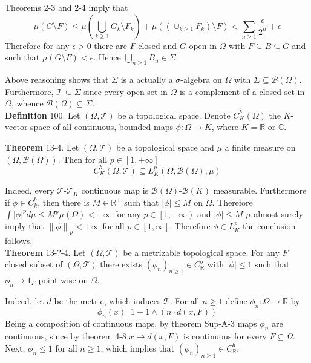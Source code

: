 \documentclass[a4paper]{article}
\newcommand{\clo}[1]{\left [ #1 \right ]}
\newcommand{\clop}[1]{\left [ #1 \right )}
\newcommand{\brac}[1]{\left ( #1 \right )}
\newcommand{\abs}[1]{\left | #1 \right |}
\newcommand{\nrm}[1]{\left\| #1 \right \|}
\newcommand{\Real}{\mathbb{R}}
\newcommand{\Cplx}{\mathbb{C}}
\newcommand{\Tcal}{\mathcal{T}}
\newcommand{\borel}[1]{\mathcal{B}\brac{#1}}
\newcommand{\defn}{\mathop{\overset{\Delta}{=}}\nolimits}
\begin{document}
Theorems 2-3 and 2-4 imply that \[\mu\brac{G\setminus F}\leq \mu\brac{\bigcup_{k\geq1} G_k\setminus F_k}+\mu\brac{\brac{\cup_{k\geq1} F_k}\setminus F}< \sum_{n\geq1} \frac{\epsilon}{2^n} + \epsilon\] Therefore for any $\epsilon>0$ there are $F$ closed and $G$ open in $\Omega$ with $F\subseteq B\subseteq G$ and such that $\mu\brac{G\setminus F}<\epsilon$. Hence $\bigcup_{n\geq1} B_n\in \Sigma$.

Above reasoning shows that $\Sigma$ is a actually a $\sigma$-algebra on $\Omega$ with $\Sigma\subseteq \borel{\Omega}$. Furthermore, $\Tcal\subseteq \Sigma$ since every open set in $\Omega$ is a complement of a closed set in $\Omega$, whence $\borel{\Omega}\subseteq \Sigma$.\\

\noindent \textbf{Definition} 100.
Let $\brac{\Omega, \Tcal}$ be a topological space. Denote $C^b_K\brac{\Omega}$ the $K$-vector space of all continuous, bounded maps $\phi:\Omega\to K$, where $K=\Real$ or $\Cplx$.

\label{thm:bound_cont_sub_lp} \noindent \textbf{Theorem} 13-4.
Let $\brac{\Omega, \Tcal}$ be a topological space and $\mu$ a finite measure on $\brac{\Omega, \borel{\Omega}}$. Then for all $p\in \clo{1,+\infty}$ \[C^b_K\brac{\Omega,\Tcal}\subseteq L^p_K\brac{\Omega,\borel{\Omega},\mu}\]

Indeed, every $\Tcal$-$\Tcal_K$ continuous map is $\borel{\Omega}$-$\borel{K}$ measurable. Furthermore if $\phi\in C^b_k$, then there is $M\in \Real^+$ such that $\abs{\phi}\leq M$ on $\Omega$. Therefore $\int \abs{\phi}^p d\mu\leq M^p \mu\brac{\Omega}<+\infty$ for any $p\in\clop{1,+\infty}$ and $\abs{\phi}\leq M$ $\mu$ almost surely imply that $\nrm{\phi}_p<+\infty$ for all $p\in \clo{1,\infty}$. Therefore $\phi\in L^p_K$ the conclusion follows.\\

\label{thm:bound_cont_indic_seq} \noindent \textbf{Theorem} 13-?-4.
Let $\brac{\Omega,\Tcal}$ be a metrizable topological space. For any $F$ closed subset of $\brac{\Omega, \Tcal}$ there exists $\brac{\phi_n}_{n\geq1}\in C^b_\Real$ with $\abs{\phi}\leq 1$ such that $\phi_n\to 1_F$ point-wise on $\Omega$.

Indeed, let $d$ be the metric, which induces $\Tcal$. For all $n\geq1$ define $\phi_n:\Omega\to\Real$ by \[\phi_n\brac{x}\defn 1 - 1\wedge\brac{n\cdot d\brac{x,F}}\] Being a composition of continuous maps, by theorem Sup-A-3 maps $\phi_n$ are continuous, since by theorem 4-8 $x\to d\brac{x,F}$ is continuous for every $F\subseteq \Omega$. Next, $\phi_n\leq1$ for all $n\geq1$, which implies that $\brac{\phi_n}_{n\geq1}\in C^b_\Real$.
\end{document}
